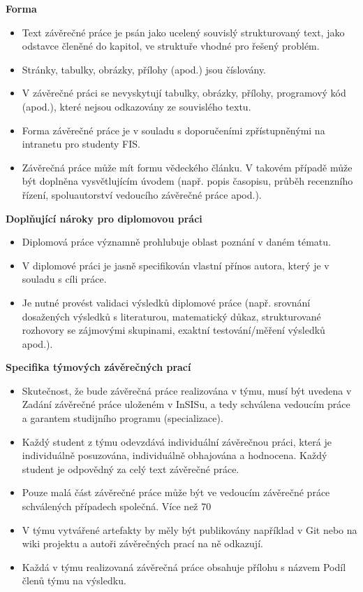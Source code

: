 {\bfseries\sffamily\Large Forma}
\begin{itemize}
\item \vspace*{-2ex}Text závěrečné práce je psán jako ucelený souvislý strukturovaný text, jako odstavce členěné do kapitol, ve struktuře vhodné pro řešený problém.
\item Stránky, tabulky, obrázky, přílohy (apod.) jsou číslovány.
\item V závěrečné práci se nevyskytují tabulky, obrázky, přílohy, programový kód (apod.), které nejsou odkazovány ze souvislého textu.
\item Forma závěrečné práce je v souladu s doporučeními zpřístupněnými na intranetu pro studenty FIS.
\item Závěrečná práce může mít formu vědeckého článku. V takovém případě může být doplněna vysvětlujícím úvodem (např. popis časopisu, průběh recenzního řízení, spoluautorství vedoucího závěrečné práce apod.).
\end{itemize}

{\bfseries\sffamily\Large Doplňující nároky pro diplomovou práci}
\begin{itemize}
\item \vspace*{-2ex}Diplomová práce významně prohlubuje oblast poznání v daném tématu.
\item V diplomové práci je jasně specifikován vlastní přínos autora, který je v souladu s cíli práce. 
\item Je nutné provést validaci výsledků diplomové práce (např. srovnání dosažených výsledků s literaturou, matematický důkaz, strukturované rozhovory se zájmovými skupinami, exaktní testování/měření výsledků apod.).
\end{itemize}

{\bfseries\sffamily\Large Specifika týmových závěrečných prací}
\begin{itemize}
\item \vspace*{-2ex}Skutečnost, že bude závěrečná práce realizována v týmu, musí být uvedena v Zadání závěrečné práce uloženém v InSISu, a tedy schválena vedoucím práce a garantem studijního programu (specializace).
\item Každý student z týmu odevzdává individuální závěrečnou práci, která je individuálně posuzována, individuálně obhajována a hodnocena. Každý student je odpovědný za celý text závěrečné práce.
\item Pouze malá část závěrečné práce může být ve vedoucím závěrečné práce schválených případech společná. Více než 70 %
\item V týmu vytvářené artefakty by měly být publikovány například v Git nebo na wiki projektu a autoři závěrečných prací na ně odkazují.
\item Každá v týmu realizovaná závěrečná práce obsahuje přílohu s názvem Podíl členů týmu na výsledku.
\end{itemize}
